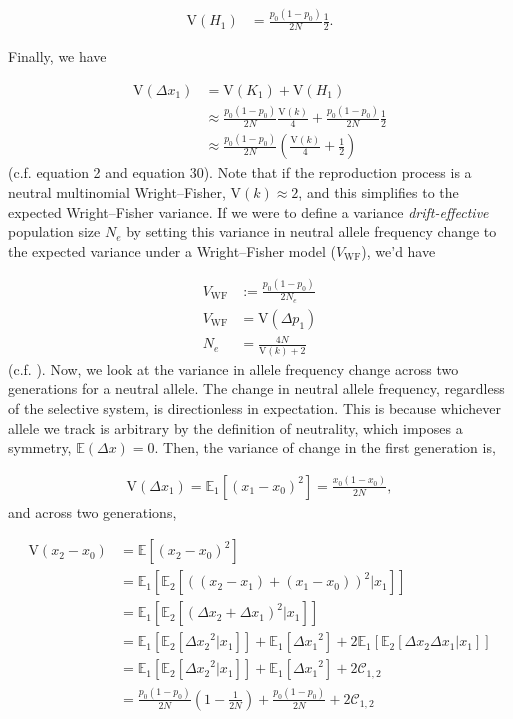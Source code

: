 \documentclass[11pt]{article}
\newcommand{\E}{\mathbb{E}}
\newcommand{\V}{\text{V}}
\newcommand{\V}{\text{V}}
\begin{document}
\begin{align}
  \V(H_1) &= \frac{p_0(1-p_0)}{2N} \frac{1}{2}.
\end{align}

Finally, we have

\begin{align}
  \V(\Delta x_1) &= \V(K_1) + \V(H_1) \\
  &\approx \frac{p_0(1-p_0)}{2N} \frac{\V(k)}{4} + \frac{p_0(1-p_0)}{2N} \frac{1}{2} \nonumber \\
                   &\approx \frac{p_0(1-p_0)}{2N}\left(\frac{\V(k)}{4} + \frac{1}{2}\right)
\end{align}
%
(c.f. \cite{Santiago1995-hx} equation 2 and \cite{Buffalo2019-qs} equation 30).
Note that if the reproduction process is a neutral multinomial Wright--Fisher,
$\V(k) \approx 2$, and this simplifies to the expected Wright--Fisher
variance. If we were to define a variance \emph{drift-effective} population
size $N_e$ by setting this variance in neutral allele frequency change to the
expected variance under a Wright--Fisher model ($V_\text{WF}$), we'd have

\begin{align}
  V_\text{WF} &:= \frac{p_0(1-p_0)}{2N_e} \nonumber \\
  V_\text{WF} &= \V(\Delta p_1) \nonumber \\
  N_e &= \frac{4N}{\V(k) + 2}
\end{align}
%
(c.f. \cite{Wright1938-tv}). Now, we look at the variance in allele frequency
change across two generations for a neutral allele. The change in neutral
allele frequency, regardless of the selective system, is directionless in
expectation. This is because whichever allele we track is arbitrary by the
definition of neutrality, which imposes a symmetry, $\E(\Delta x) = 0$. Then, the
variance of change in the first generation is,

\begin{align}
  \V(\Delta x_1) = \E_1\left[(x_1 - x_0)^2\right]= \frac{x_0(1-x_0)}{2N},
\end{align}
%
and across two generations,

\begin{align}
  \label{eq:var_wf}
  \V(x_2 - x_0) &= \E\left[(x_2 - x_0)^2\right] \nonumber \\
          &= \E_1\left[\E_2\left[((x_2-x_1) + (x_1 - x_0))^2 | x_1\right]\right] \nonumber \\
          &= \E_1\left[\E_2\left[(\Delta x_2 + \Delta x_1)^2 | x_1\right]\right] \nonumber \\
          &= \E_1\left[\E_2\left[{\Delta x_2}^2|x_1\right]\right] + \E_1\left[ {\Delta x_1}^2\right] + 2\E_1\left[\E_2[\Delta x_2 \Delta x_1 | x_1]\right] \nonumber \\
          &= \E_1\left[\E_2\left[{\Delta x_2}^2|x_1\right]\right] + \E_1\left[ {\Delta x_1}^2\right] + 2\mathcal{C}_{1,2} \nonumber \\
          &= \frac{p_0(1-p_0)}{2N}\left(1 - \frac{1}{2N}\right) + \frac{p_0(1-p_0)}{2N} + 2\mathcal{C}_{1,2}
\end{align}
\end{document}
